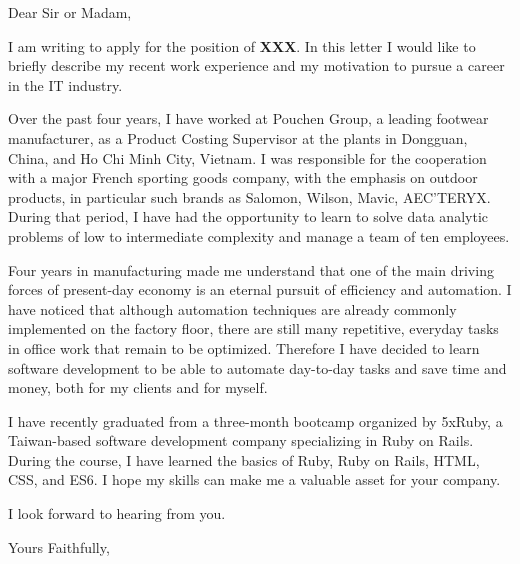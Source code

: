 \documentclass[a4paper,12pt]{letter}
\begin{document}
\begin{letter}

  \opening{Dear Sir or Madam,}

  I am writing to apply for the position of \textbf{XXX}. In this letter
  I would like to briefly describe my recent work experience and my motivation
  to pursue a career in the IT industry.
  
Over the past four years, I
have worked at Pouchen Group, a leading footwear manufacturer, as a Product
Costing Supervisor at the plants in Dongguan, China, and Ho Chi Minh City,
Vietnam. I was responsible for the cooperation with a major French sporting
goods company, with the emphasis on outdoor products, in particular such brands 
as Salomon, Wilson,
Mavic, AEC'TERYX. %
During that period, I have had the opportunity to learn to solve data analytic problems of low to intermediate complexity and manage a team of ten employees.

Four years in manufacturing made me understand that one of the main
driving forces of present-day economy is an eternal pursuit of efficiency and
automation. I have noticed that although automation techniques are already commonly
implemented on the factory floor, there are still many repetitive, everyday
tasks in office work that remain to be optimized. Therefore I have decided to
learn software development to be able to automate 
day-to-day tasks and save time and money, both for my clients and for myself.

I have recently graduated from a three-month bootcamp organized by 5xRuby, a Taiwan-based
software development company specializing in Ruby on Rails.
During the course, I have learned the basics of Ruby, Ruby on Rails, HTML, CSS,
and ES6.
I hope my skills can make me a valuable asset for your company.

I look forward to hearing from you.

\closing{Yours Faithfully,\\
  \\
  }

\end{letter}
\end{document}
